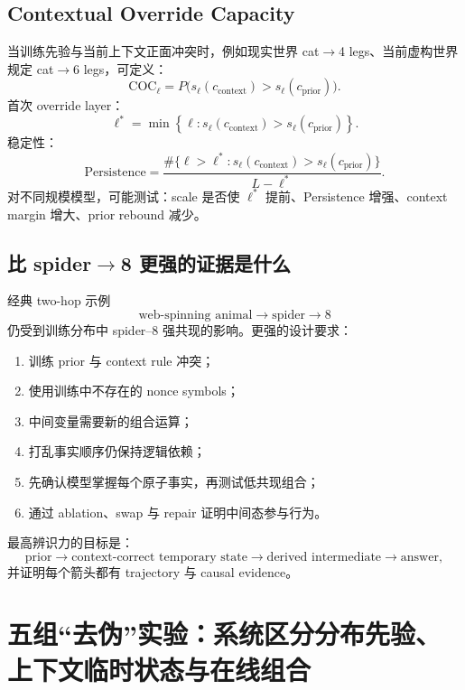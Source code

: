 \documentclass[10.5pt,a4paper]{ctexart}
\begin{document}
\subsection{Contextual Override Capacity}
当训练先验与当前上下文正面冲突时，例如现实世界 cat$\to$4 legs、当前虚构世界规定 cat$\to$6 legs，可定义：
\[
\mathrm{COC}_\ell
=
P\bigl(
 s_\ell(c_{\mathrm{context}})
>
 s_\ell(c_{\mathrm{prior}})
\bigr).
\]
首次 override layer：
\[
\ell^*
=
\min\left\{
\ell:
 s_\ell(c_{\mathrm{context}})
>
 s_\ell(c_{\mathrm{prior}})
\right\}.
\]
稳定性：
\[
\mathrm{Persistence}
=
\frac{
\#\{\ell>\ell^*:s_\ell(c_{\mathrm{context}})>s_\ell(c_{\mathrm{prior}})\}
}{L-\ell^*}.
\]
对不同规模模型，可能测试：scale 是否使 $\ell^*$ 提前、Persistence 增强、context margin 增大、prior rebound 减少。

\subsection{比 spider$\to$8 更强的证据是什么}
经典 two-hop 示例
\[
\text{web-spinning animal}\to\text{spider}\to8
\]
仍受到训练分布中 spider--8 强共现的影响。更强的设计要求：
\begin{enumerate}
  \item 训练 prior 与 context rule 冲突；
  \item 使用训练中不存在的 nonce symbols；
  \item 中间变量需要新的组合运算；
  \item 打乱事实顺序仍保持逻辑依赖；
  \item 先确认模型掌握每个原子事实，再测试低共现组合；
  \item 通过 ablation、swap 与 repair 证明中间态参与行为。
\end{enumerate}
最高辨识力的目标是：
\[
\text{prior}
\rightarrow
\text{context-correct temporary state}
\rightarrow
\text{derived intermediate}
\rightarrow
\text{answer},
\]
并证明每个箭头都有 trajectory 与 causal evidence。

\section{五组“去伪”实验：系统区分分布先验、上下文临时状态与在线组合}
\end{document}
